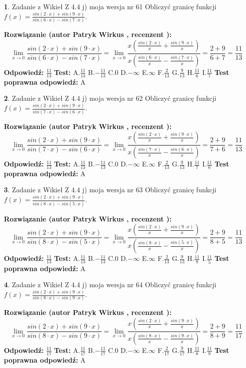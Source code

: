 \documentclass[12pt, a4paper]{article}
\theoremstyle{definition} %
\newtheorem{zad}{}
\newcommand{\zadStart}[1]{\begin{zad}#1\newline}
\newcommand{\zadStop}{\end{zad}}
\newcommand{\rozwStart}[2]{\noindent \textbf{Rozwiązanie (autor #1 , recenzent #2): }\newline}
\newcommand{\rozwStop}{\newline}
\newcommand{\odpStart}{\noindent \textbf{Odpowiedź:}\newline}
\newcommand{\odpStop}{\newline}
\newcommand{\testStart}{\noindent \textbf{Test:}\newline}
\newcommand{\testStop}{\newline}
\newcommand{\kluczStart}{\noindent \textbf{Test poprawna odpowiedź:}\newline}
\newcommand{\kluczStop}{\newline}
\begin{document}
\zadStart{Zadanie z Wikieł Z 4.4 j) moja wersja nr 61}
Obliczyć granicę funkcji $f(x)=\frac{sin(2\cdot x) +sin(9\cdot x)}{sin(6\cdot x) -sin(7\cdot x)}$.
\zadStop
\rozwStart{Patryk Wirkus}{}
$$\lim\limits_{x\to 0}\frac{sin(2\cdot x) +sin(9\cdot x)}{sin(6\cdot x) -sin(7\cdot x)}=\lim\limits_{x\to 0}\frac{x(\frac{sin(2\cdot x)}{x}+\frac{sin(9\cdot x)}{x})}{x(\frac{sin(6\cdot x)}{x}-\frac{sin(7\cdot x)}{x})}=\frac{2+9}{6+7} = \frac{11}{13}$$
\rozwStop
\odpStart
$\frac{11}{13}$
\odpStop
\testStart
A.$\frac{11}{13}$
B.$-\frac{11}{13}$
C.$0$
D.$-\infty$
E.$\infty$
F.$\frac{2}{13}$
G.$\frac{9}{13}$
H.$\frac{11}{6}$
I.$\frac{11}{7}$
\testStop
\kluczStart
A
\kluczStop



\zadStart{Zadanie z Wikieł Z 4.4 j) moja wersja nr 62}
Obliczyć granicę funkcji $f(x)=\frac{sin(2\cdot x) +sin(9\cdot x)}{sin(7\cdot x) -sin(6\cdot x)}$.
\zadStop
\rozwStart{Patryk Wirkus}{}
$$\lim\limits_{x\to 0}\frac{sin(2\cdot x) +sin(9\cdot x)}{sin(7\cdot x) -sin(6\cdot x)}=\lim\limits_{x\to 0}\frac{x(\frac{sin(2\cdot x)}{x}+\frac{sin(9\cdot x)}{x})}{x(\frac{sin(7\cdot x)}{x}-\frac{sin(6\cdot x)}{x})}=\frac{2+9}{7+6} = \frac{11}{13}$$
\rozwStop
\odpStart
$\frac{11}{13}$
\odpStop
\testStart
A.$\frac{11}{13}$
B.$-\frac{11}{13}$
C.$0$
D.$-\infty$
E.$\infty$
F.$\frac{2}{13}$
G.$\frac{9}{13}$
H.$\frac{11}{7}$
I.$\frac{11}{6}$
\testStop
\kluczStart
A
\kluczStop



\zadStart{Zadanie z Wikieł Z 4.4 j) moja wersja nr 63}
Obliczyć granicę funkcji $f(x)=\frac{sin(2\cdot x) +sin(9\cdot x)}{sin(8\cdot x) -sin(5\cdot x)}$.
\zadStop
\rozwStart{Patryk Wirkus}{}
$$\lim\limits_{x\to 0}\frac{sin(2\cdot x) +sin(9\cdot x)}{sin(8\cdot x) -sin(5\cdot x)}=\lim\limits_{x\to 0}\frac{x(\frac{sin(2\cdot x)}{x}+\frac{sin(9\cdot x)}{x})}{x(\frac{sin(8\cdot x)}{x}-\frac{sin(5\cdot x)}{x})}=\frac{2+9}{8+5} = \frac{11}{13}$$
\rozwStop
\odpStart
$\frac{11}{13}$
\odpStop
\testStart
A.$\frac{11}{13}$
B.$-\frac{11}{13}$
C.$0$
D.$-\infty$
E.$\infty$
F.$\frac{2}{13}$
G.$\frac{9}{13}$
H.$\frac{11}{8}$
I.$\frac{11}{5}$
\testStop
\kluczStart
A
\kluczStop



\zadStart{Zadanie z Wikieł Z 4.4 j) moja wersja nr 64}
Obliczyć granicę funkcji $f(x)=\frac{sin(2\cdot x) +sin(9\cdot x)}{sin(8\cdot x) -sin(9\cdot x)}$.
\zadStop
\rozwStart{Patryk Wirkus}{}
$$\lim\limits_{x\to 0}\frac{sin(2\cdot x) +sin(9\cdot x)}{sin(8\cdot x) -sin(9\cdot x)}=\lim\limits_{x\to 0}\frac{x(\frac{sin(2\cdot x)}{x}+\frac{sin(9\cdot x)}{x})}{x(\frac{sin(8\cdot x)}{x}-\frac{sin(9\cdot x)}{x})}=\frac{2+9}{8+9} = \frac{11}{17}$$
\rozwStop
\odpStart
$\frac{11}{17}$
\odpStop
\testStart
A.$\frac{11}{17}$
B.$-\frac{11}{17}$
C.$0$
D.$-\infty$
E.$\infty$
F.$\frac{2}{17}$
G.$\frac{9}{17}$
H.$\frac{11}{8}$
I.$\frac{11}{9}$
\testStop
\kluczStart
A
\kluczStop
\end{document}
